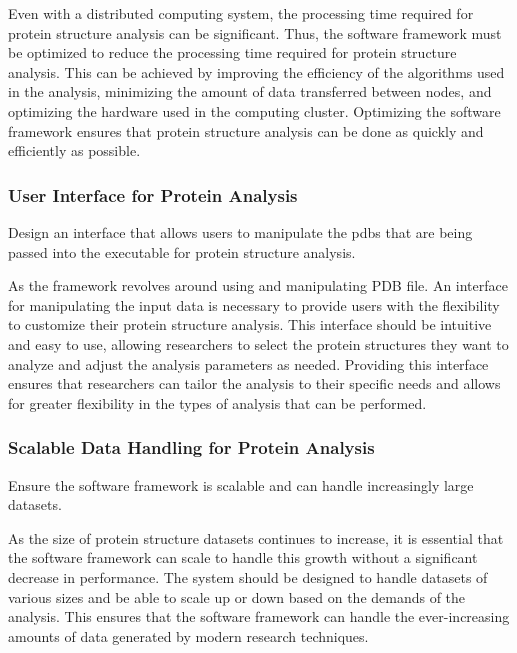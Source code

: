 \documentclass[]{final_report}
\begin{document}
Even with a distributed computing system, the processing time required for protein structure analysis can be significant. Thus, the software framework must be optimized to reduce the processing time required for protein structure analysis. This can be achieved by improving the efficiency of the algorithms used in the analysis, minimizing the amount of data transferred between nodes, and optimizing the hardware used in the computing cluster. Optimizing the software framework ensures that protein structure analysis can be done as quickly and efficiently as possible.
\clearpage

\subsubsection{User Interface for Protein Analysis}

\begin{displayquote}
    Design an interface that allows users to manipulate the pdbs that are being passed into the executable for protein structure analysis.
\end{displayquote}

As the framework revolves around using and manipulating PDB file. An interface for manipulating the input data is necessary to provide users with the flexibility to customize their protein structure analysis. This interface should be intuitive and easy to use, allowing researchers to select the protein structures they want to analyze and adjust the analysis parameters as needed. Providing this interface ensures that researchers can tailor the analysis to their specific needs and allows for greater flexibility in the types of analysis that can be performed.

\subsubsection{Scalable Data Handling for Protein Analysis}

\begin{displayquote}
    Ensure the software framework is scalable and can handle increasingly large datasets.
\end{displayquote}

As the size of protein structure datasets continues to increase, it is essential that the software framework can scale to handle this growth without a significant decrease in performance. The system should be designed to handle datasets of various sizes and be able to scale up or down based on the demands of the analysis. This ensures that the software framework can handle the ever-increasing amounts of data generated by modern research techniques.
\clearpage
\end{document}
